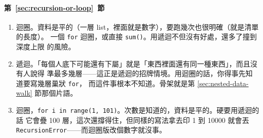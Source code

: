 \paragraph{第~\ref{sec:recursion-or-loop}~節}
\begin{enumerate}
\item 迴圈。資料是平的（一層 list，裡面就是數字），要跑幾次也很明確（就是清單的長度）。
一個 \texttt{for} 迴圈，或直接 \texttt{sum()}。用遞迴不但沒有好處，還多了撞到深度上限
的風險。
\item 遞迴。「每個人底下可能還有下屬」就是「東西裡面還有同一種東西」，而且沒有人說得
準最多幾層——這正是遞迴的招牌情境。用迴圈的話，你得事先知道要寫幾層巢狀 \texttt{for}，
而這件事根本不知道。骨架就是第 \ref{sec:nested-data-walk} 節那個片語。
\item 迴圈，\texttt{for i in range(1, 101)}。次數是知道的，資料是平的。硬要用遞迴的話
它會疊 100 層，這次還撐得住，但同樣的寫法拿去印 1 到 10000 就會丟
\texttt{RecursionError}——而迴圈版改個數字就沒事。
\end{enumerate}
